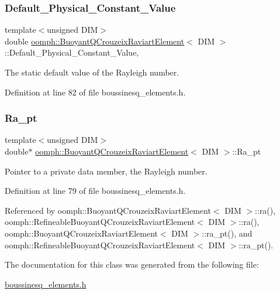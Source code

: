 \subsubsection{\texorpdfstring{Default\+\_\+\+Physical\+\_\+\+Constant\+\_\+\+Value}{Default\_Physical\_Constant\_Value}}
{\footnotesize\ttfamily template$<$unsigned D\+IM$>$ \\
double \hyperlink{classoomph_1_1BuoyantQCrouzeixRaviartElement}{oomph\+::\+Buoyant\+Q\+Crouzeix\+Raviart\+Element}$<$ D\+IM $>$\+::Default\+\_\+\+Physical\+\_\+\+Constant\+\_\+\+Value\hspace{0.3cm}{\ttfamily [static]}, {\ttfamily [private]}}



The static default value of the Rayleigh number. 



Definition at line 82 of file boussinesq\+\_\+elements.\+h.

\mbox{\label{classoomph_1_1BuoyantQCrouzeixRaviartElement_a054ffb965ec8cce9b6b2da2336a1e7d8}} 
\subsubsection{\texorpdfstring{Ra\+\_\+pt}{Ra\_pt}}
{\footnotesize\ttfamily template$<$unsigned D\+IM$>$ \\
double$\ast$ \hyperlink{classoomph_1_1BuoyantQCrouzeixRaviartElement}{oomph\+::\+Buoyant\+Q\+Crouzeix\+Raviart\+Element}$<$ D\+IM $>$\+::Ra\+\_\+pt\hspace{0.3cm}{\ttfamily [private]}}



Pointer to a private data member, the Rayleigh number. 



Definition at line 79 of file boussinesq\+\_\+elements.\+h.



Referenced by oomph\+::\+Buoyant\+Q\+Crouzeix\+Raviart\+Element$<$ D\+I\+M $>$\+::ra(), oomph\+::\+Refineable\+Buoyant\+Q\+Crouzeix\+Raviart\+Element$<$ D\+I\+M $>$\+::ra(), oomph\+::\+Buoyant\+Q\+Crouzeix\+Raviart\+Element$<$ D\+I\+M $>$\+::ra\+\_\+pt(), and oomph\+::\+Refineable\+Buoyant\+Q\+Crouzeix\+Raviart\+Element$<$ D\+I\+M $>$\+::ra\+\_\+pt().



The documentation for this class was generated from the following file\+:\begin{DoxyCompactItemize}
\item 
\hyperlink{boussinesq__elements_8h}{boussinesq\+\_\+elements.\+h}\end{DoxyCompactItemize}
